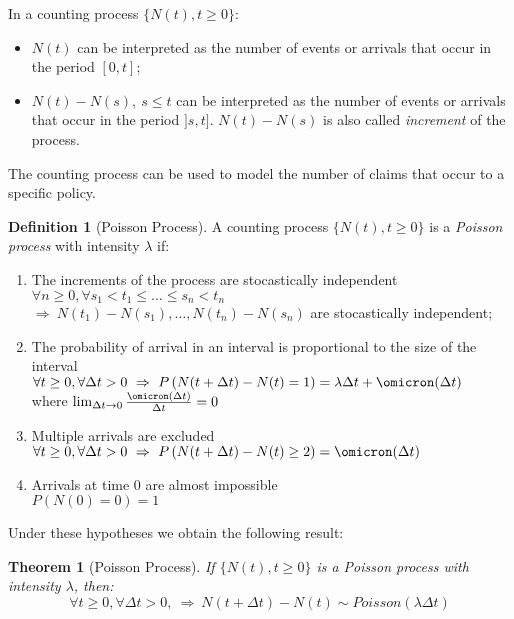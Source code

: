 \documentclass[a4paper, nobind]{templates/ociamthesis}
\providecommand{\tightlist}{%
  \setlength{\itemsep}{0pt}\setlength{\parskip}{0pt}}
\newtheorem{theorem}{Theorem}[chapter]
\theoremstyle{definition}
\newtheorem{definition}{Definition}[chapter]
\theoremstyle{definition}
\theoremstyle{definition}
\theoremstyle{remark}
\begin{document}
In a counting process \(\{N(t), t\ge0\}\):

\begin{itemize}
\tightlist
\item
  \(N(t)\) can be interpreted as the number of events or arrivals that occur in the period \([0, t]\);
\item
  \(N(t) - N(s), \ s\le t\) can be interpreted as the number of events or arrivals that occur in the period \(]s, t]\). \(N(t) - N(s)\) is also called \emph{increment} of the process.
\end{itemize}

The counting process can be used to model the number of claims that occur to a specific policy.

\begin{definition}[Poisson Process]
\label{def:def-process-poisson} \iffalse (Poisson Process) \fi{} A counting process \(\{N(t), t\ge0\}\) is a \textit{Poisson process} with intensity \(\lambda\) if:

\begin{enumerate}
\item The increments of the process are stocastically independent \\
      $\forall n\ge0, \forall s_1 < t_1 \le \dots \le s_n < t_n$ \\
      $\Rightarrow \ N(t_1)-N(s_1), \dots, N(t_n)-N(s_n)$ are stocastically independent;
\item The probability of arrival in an interval is proportional to the size of the interval \\
      $\forall t\ge 0, \forall \Delta t >0 \ \Rightarrow \ P\left( N(t + \Delta t) - N(t) = 1 \right) = \lambda \Delta t + \omicron (\Delta t)$ \\
      where $\lim_{\Delta t \to 0}{\frac{\omicron(\Delta t)}{\Delta t}} = 0$
\item Multiple arrivals are excluded \\
      $\forall t\ge 0, \forall \Delta t >0 \ \Rightarrow \ P\left( N(t + \Delta t) - N(t) \ge 2 \right) = \omicron (\Delta t)$
\item Arrivals at time $0$ are almost impossible \\
      $P\left( N(0) = 0 \right) = 1 $
\end{enumerate}
\end{definition}

Under these hypotheses we obtain the following result:

\begin{theorem}[Poisson Process]
\label{thm:th-process-poisson} \iffalse (Poisson Process) \fi{} If \(\{N(t), t\ge 0 \}\) is a Poisson process with intensity \(\lambda\), then:
\[\forall t\ge 0, \forall \Delta t >0, \ \Rightarrow \ N(t + \Delta t) - N(t) \sim Poisson(\lambda \Delta t)\]
\end{theorem}
\end{document}
